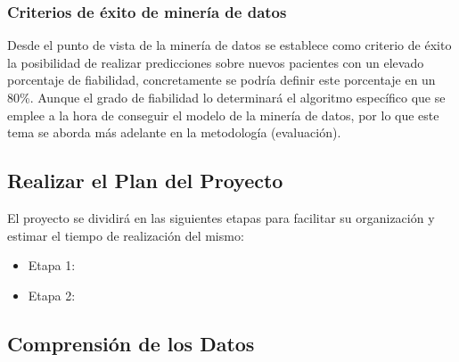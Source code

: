 \documentclass{article}
\begin{document}
\subsubsection{Criterios de éxito de minería de datos}
Desde el punto de vista de la minería de datos se establece como criterio de éxito la posibilidad de realizar predicciones sobre nuevos pacientes con un elevado porcentaje de fiabilidad, concretamente se podría definir este porcentaje en un 80\%. Aunque el grado de fiabilidad lo determinará el algoritmo específico que se emplee a la hora de conseguir el modelo de la minería de datos, por lo que este tema se aborda más adelante en la metodología (evaluación).

\subsection{Realizar el Plan del Proyecto}
El proyecto se dividirá en las siguientes etapas para facilitar su organización y estimar el tiempo de realización del mismo:

\begin{itemize}
	\item Etapa 1:
	\item Etapa 2:
\end{itemize}

\subsection{Comprensión de los Datos}
\end{document}

